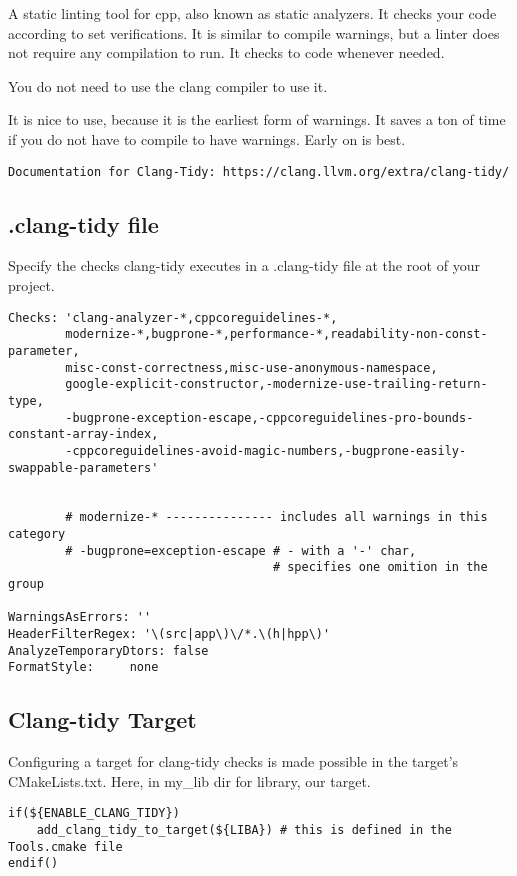 \documentclass[openany]{report}
\begin{document}
A static linting tool for cpp, also known as static analyzers. It checks your code according
to set verifications. It is similar to compile warnings, but a linter does not require any compilation
to run. It checks to code whenever needed.


You do not need to use the clang compiler to use it.


It is nice to use, because it is the earliest form of warnings. It saves a ton of time if you do not have to compile
to have warnings. Early on is best.

\begin{verbatim}
Documentation for Clang-Tidy: https://clang.llvm.org/extra/clang-tidy/
\end{verbatim}


\subsection{.clang-tidy file}

Specify the checks clang-tidy executes in a .clang-tidy file at the root of your project.

\begin{verbatim}
Checks: 'clang-analyzer-*,cppcoreguidelines-*,
        modernize-*,bugprone-*,performance-*,readability-non-const-parameter,
        misc-const-correctness,misc-use-anonymous-namespace,
        google-explicit-constructor,-modernize-use-trailing-return-type,
        -bugprone-exception-escape,-cppcoreguidelines-pro-bounds-constant-array-index,
        -cppcoreguidelines-avoid-magic-numbers,-bugprone-easily-swappable-parameters'


        # modernize-* --------------- includes all warnings in this category
        # -bugprone=exception-escape # - with a '-' char, 
                                     # specifies one omition in the group

WarningsAsErrors: ''
HeaderFilterRegex: '\(src|app\)\/*.\(h|hpp\)'
AnalyzeTemporaryDtors: false
FormatStyle:     none
\end{verbatim}


\subsection{Clang-tidy Target}

Configuring a target for clang-tidy checks is made possible in the target's CMakeLists.txt. Here, in my\_lib dir
for library, our target.


\begin{verbatim}
if(${ENABLE_CLANG_TIDY})
    add_clang_tidy_to_target(${LIBA}) # this is defined in the Tools.cmake file
endif()
\end{verbatim}
\end{document}
